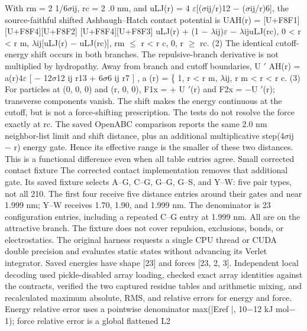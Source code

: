 \documentclass[11pt]{article}
\begin{document}
With rm = 2 1/6\ensuremath{\sigma}ij, rc = 2 .0 nm, and uLJ(r) = 4 \ensuremath{\varepsilon}[(\ensuremath{\sigma}ij/r)12 \ensuremath{-} (\ensuremath{\sigma}ij/r)6], the source-faithful shifted
Ashbaugh–Hatch contact potential is
UAH(r) =
[U+F8F1]
[U+F8F4][U+F8F2]
[U+F8F4][U+F8F3]
uLJ(r) + (1 \ensuremath{-} \ensuremath{\lambda}ij)\ensuremath{\varepsilon} \ensuremath{-} \ensuremath{\lambda}ijuLJ(rc), 0 < r < r m,
\ensuremath{\lambda}ij[uLJ(r) \ensuremath{-} uLJ(rc)], rm \ensuremath{\leq} r < r c,
0, r \ensuremath{\geq} rc.
(2)
The identical cutoff-energy shift occurs in both branches. The repulsive-branch derivative is not
multiplied by hydropathy. Away from branch and cutoff boundaries,
U \ensuremath{\prime}
AH(r) = a(r)4\ensuremath{\varepsilon}
[
\ensuremath{-}
12\ensuremath{\sigma}12
ij
r13 +
6\ensuremath{\sigma}6
ij
r7
]
, a (r) =
\{
1, r < r m,
\ensuremath{\lambda}ij, r m < r < r c. (3)
For particles at (0, 0, 0) and (r, 0, 0), F1x = + U \ensuremath{\prime}(r) and F2x = \ensuremath{-}U \ensuremath{\prime}(r); transverse components
vanish. The shift makes the energy continuous at the cutoff, but is not a force-shifting prescription.
The tests do not resolve the force exactly at rc.
The saved OpenABC comparison reports the same 2.0 nm neighbor-list limit and shift distance,
plus an additional multiplicative step(4\ensuremath{\sigma}ij \ensuremath{-} r) energy gate. Hence its effective range is the smaller
of these two distances. This is a functional difference even when all table entries agree.
Small corrected contact fixture
The corrected contact implementation removes that additional gate. Its saved fixture selects A–G,
C–G, G–G, G–S, and Y–W: five pair types, not all 210. The first four receive five distance entries
around their gates and near 1.999 nm; Y–W receives 1.70, 1.90, and 1.999 nm. The denominator
is 23 configuration entries, including a repeated C–G entry at 1.999 nm. All are on the attractive
branch. The fixture does not cover repulsion, exclusions, bonds, or electrostatics.
The original harness requests a single CPU thread or CUDA double precision and evaluates static
states without advancing its Verlet integrator. Saved energies have shape [23] and forces [23, 2, 3].
Independent local decoding used pickle-disabled array loading, checked exact array identities against
the contracts, verified the two captured residue tables and arithmetic mixing, and recalculated
maximum absolute, RMS, and relative errors for energy and force. Energy relative error uses a
pointwise denominator max(|Eref |, 10\ensuremath{-}12 kJ mol\ensuremath{-}1); force relative error is a global flattened L2
\end{document}
